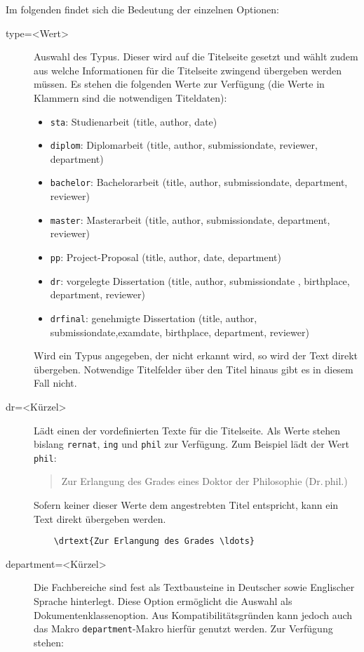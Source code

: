 \documentclass[
	ngerman,
	ruledheaders=section,%
	class=report,%
	thesis={type=bachelor},%
	accentcolor=9c,%
	custommargins=true,%
	marginpar=false,%
	parskip=half-,%
	fontsize=11pt,%
]{tudapub}
\let\code\texttt
\begin{document}
Im folgenden findet sich die Bedeutung der einzelnen Optionen:
\begin{description}
\item[type=<Wert>] Auswahl des Typus. Dieser wird auf die Titelseite gesetzt und wählt zudem aus welche Informationen für die Titelseite zwingend übergeben werden müssen.
	Es stehen die folgenden Werte zur Verfügung (die Werte in Klammern sind die notwendigen Titeldaten):
	\begin{itemize}
	\item \code{sta}: Studienarbeit (title, author, date)
	\item \code{diplom}: Diplomarbeit (title, author, submissiondate, reviewer, department)
	\item \code{bachelor}: Bachelorarbeit (title, author, submissiondate, department, reviewer)
	\item \code{master}: Masterarbeit (title, author, submissiondate, department, reviewer)
	\item \code{pp}: Project-Proposal  (title, author, date, department)
	\item \code{dr}: vorgelegte Dissertation (title, author, submissiondate , birthplace, department, reviewer)
	\item \code{drfinal}: genehmigte Dissertation (title, author, submissiondate,examdate, birthplace, department, reviewer)
	\end{itemize}
	Wird ein Typus angegeben, der nicht erkannt wird, so wird der Text direkt übergeben. Notwendige Titelfelder über den Titel hinaus gibt es in diesem Fall nicht.
\item[dr=<Kürzel>] Lädt einen der vordefinierten Texte für die Titelseite. Als Werte stehen bislang \code{rernat}, \code{ing} und \code{phil} zur Verfügung. Zum Beispiel lädt der Wert \code{phil}:
	\begin{quote}
	Zur Erlangung des Grades eines Doktor der Philosophie (Dr.\,phil.)
	\end{quote}
	Sofern keiner dieser Werte dem angestrebten Titel entspricht, kann ein Text direkt übergeben werden.
	\begin{verbatim}
	\drtext{Zur Erlangung des Grades \ldots}
	\end{verbatim}
\item[department=<Kürzel>] Die Fachbereiche sind fest als Textbausteine in Deutscher sowie Englischer Sprache hinterlegt. Diese Option ermöglicht die Auswahl als Dokumentenklassenoption. Aus Kompatibilitätsgründen kann jedoch auch das Makro \code{department}-Makro hierfür genutzt werden. Zur Verfügung stehen:\par

\end{description}
\end{document}
